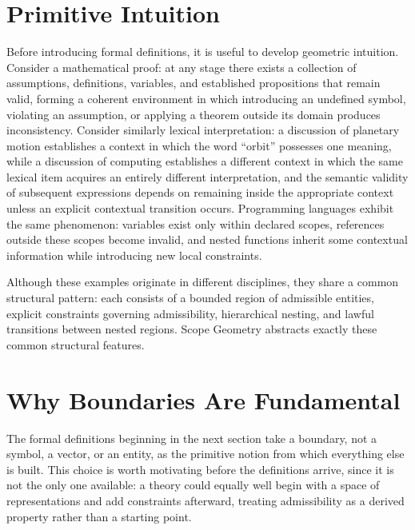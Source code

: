 \documentclass[11pt,twoside,openright]{book}
\numberwithin{equation}{chapter}
\theoremstyle{definition}
\theoremstyle{plain}
\theoremstyle{remark}
\theoremstyle{definition}
\begin{document}
\section{Primitive Intuition}

Before introducing formal definitions, it is useful to develop geometric
intuition. Consider a mathematical proof: at any stage there exists a
collection of assumptions, definitions, variables, and established
propositions that remain valid, forming a coherent environment in which
introducing an undefined symbol, violating an assumption, or applying a
theorem outside its domain produces inconsistency. Consider similarly
lexical interpretation: a discussion of planetary motion establishes a
context in which the word ``orbit'' possesses one meaning, while a
discussion of computing establishes a different context in which the same
lexical item acquires an entirely different interpretation, and the
semantic validity of subsequent expressions depends on remaining inside
the appropriate context unless an explicit contextual transition occurs.
Programming languages exhibit the same phenomenon: variables exist only
within declared scopes, references outside these scopes become invalid,
and nested functions inherit some contextual information while
introducing new local constraints.

Although these examples originate in different disciplines, they share a
common structural pattern: each consists of a bounded region of
admissible entities, explicit constraints governing admissibility,
hierarchical nesting, and lawful transitions between nested regions.
Scope Geometry abstracts exactly these common structural features.

\section{Why Boundaries Are Fundamental}

The formal definitions beginning in the next section take a boundary,
not a symbol, a vector, or an entity, as the primitive notion from which
everything else is built. This choice is worth motivating before the
definitions arrive, since it is not the only one available: a theory
could equally well begin with a space of representations and add
constraints afterward, treating admissibility as a derived property
rather than a starting point.
\end{document}

